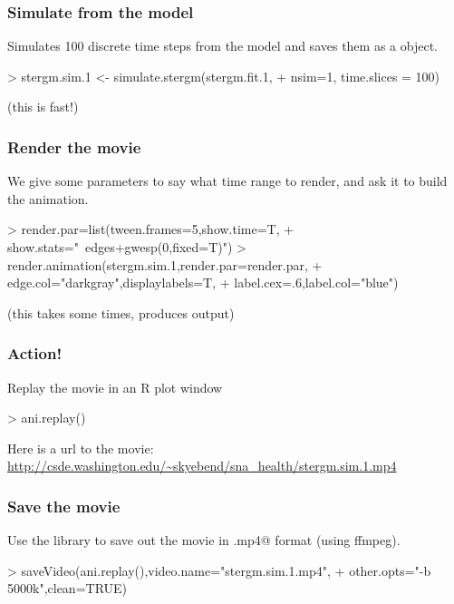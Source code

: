 \documentclass{beamer}
\begin{document}
\begin{frame}[fragile]
\frametitle{Simulate from the model}
Simulates 100 discrete time steps from the model and saves them as a \verb@dynamicNetwork@ object.
\begin{Schunk}
\begin{Sinput}
> stergm.sim.1 <- simulate.stergm(stergm.fit.1,
+                     nsim=1, time.slices = 100)
\end{Sinput}
\end{Schunk}
(this is fast!)
\end{frame}

\begin{frame}[fragile]
\frametitle{Render the movie}
We give some parameters to say what time range to render, and ask it to build the animation.

\begin{Schunk}
\begin{Sinput}
> render.par=list(tween.frames=5,show.time=T,
+                 show.stats="~edges+gwesp(0,fixed=T)")
> render.animation(stergm.sim.1,render.par=render.par,
+                  edge.col="darkgray",displaylabels=T,
+                  label.cex=.6,label.col="blue")
\end{Sinput}
\end{Schunk}
(this takes some times, produces output)
\end{frame}
\begin{frame}[fragile]
\frametitle{Action!}
Replay the movie in an R plot window
\begin{Schunk}
\begin{Sinput}
> ani.replay()
\end{Sinput}
\end{Schunk}

Here is a url to the movie:
\url{http://csde.washington.edu/~skyebend/sna_health/stergm.sim.1.mp4}

\end{frame}

\begin{frame}[fragile]
\frametitle{Save the movie}
Use the \verb@animation@ library to save out the movie in \verb@.mp4@ format (using ffmpeg).

\begin{Schunk}
\begin{Sinput}
> saveVideo(ani.replay(),video.name="stergm.sim.1.mp4", 
+                     other.opts="-b 5000k",clean=TRUE)
\end{Sinput}
\end{Schunk}
\end{frame}
\end{document}
